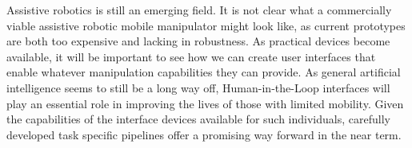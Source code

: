 Assistive robotics is still an emerging field. It is not clear what a commercially viable assistive robotic mobile manipulator might look like, as current prototypes are both too expensive and lacking in robustness. As practical devices become available, it will be important to see how we can create user interfaces that enable whatever manipulation capabilities they can provide. As general artificial intelligence seems to still be a long way off, Human-in-the-Loop interfaces will play an essential role in improving the lives of those with limited mobility. Given the capabilities of the interface devices available for such individuals, carefully developed task specific pipelines offer a promising way forward in the near term. 

